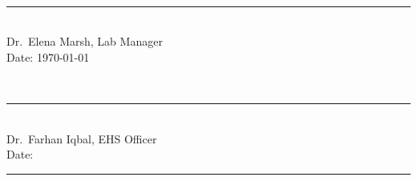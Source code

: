 \noindent
\begin{minipage}[t]{0.48\linewidth}\vspace{0pt}
\small{}\\[6pt]
\rule{5.5cm}{0.4pt}\\
Dr.\ Elena Marsh, Lab Manager \\
Date: \today
\end{minipage}%
\hfill
\begin{minipage}[t]{0.48\linewidth}\vspace{0pt}
\small{}\\[6pt]
\rule{5.5cm}{0.4pt}\\
Dr.\ Farhan Iqbal, EHS Officer \\
Date: \rule{2.5cm}{0.4pt}
\end{minipage}
